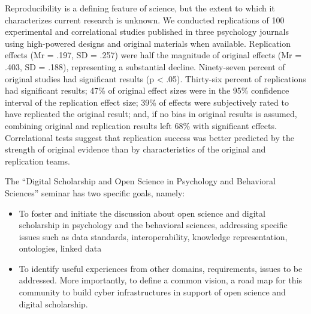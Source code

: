 \documentclass[a4paper,USenglish]{dagrep}
\begin{document}
  


{}
\license
{}
Reproducibility is a defining feature of science, but the extent to which it characterizes 
current research is unknown.  We conducted replications of 100 experimental and 
correlational studies published in three psychology journals using high-powered designs and 
original materials when available.  Replication effects (Mr = .197, SD = .257) were half the 
magnitude of original effects (Mr = .403, SD = .188), representing a substantial decline.  
Ninety-seven percent of original studies had significant results (p < .05).  Thirty-six percent 
of replications had significant results; 47\% of original effect sizes were in the 95\% confidence 
interval of the replication effect size; 39\% of effects were subjectively rated to have replicated 
the original result; and, if no bias in original results is assumed, combining original and 
replication results left 68\% with significant effects. Correlational tests suggest that replication 
success was better predicted by the strength of original evidence than by characteristics of 
the original and replication teams.

{}
\license

The ``Digital Scholarship and Open Science in Psychology and Behavioral Sciences'' seminar has two specific goals, namely:
\begin{itemize}
\item To foster and initiate the discussion about open science and
  digital scholarship in psychology and the behavioral sciences,
  addressing specific issues such as data standards, interoperability,
  knowledge representation, ontologies, linked data
\item To identify
  useful experiences from other domains, requirements, issues to be
  addressed. More importantly, to define a common vision, a road map
  for this community to build cyber infrastructures in support of open
  science and digital scholarship.
\end{itemize}
\end{document}
